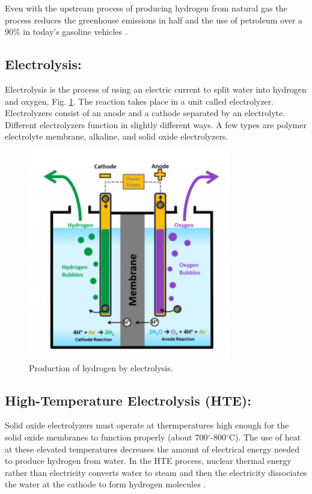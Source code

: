\documentclass{anstrans}
\begin{document}
Even with the upstream process of producing hydrogen from natural gas the process reduces the greenhouse emissions in half and the use of petroleum over a 90\% in today's gasoline vehicles \cite{noauthor_hydrogen_nodate}.

\subsection{Electrolysis:}

Electrolysis is the process of using an electric current to split water into hydrogen and oxygen, Fig. \ref{fig:electro}. The reaction takes place in a unit called electrolyzer. Electrolyzers consist of an anode and a cathode separated by an electrolyte. Different electrolyzers function in slightly different ways. A few types are polymer electrolyte membrane, alkaline, and solid oxide electrolyzers.

\begin{figure}[]
	\centering
	\includegraphics[width=0.55\linewidth]{figures/electrolysis.png}
	\hfill
	\caption{Production of hydrogen by electrolysis.}
	\label{fig:electro}
\end{figure}

\subsection{High-Temperature Electrolysis (HTE):}

Solid oxide electrolyzers must operate at thermperatures high enough for the solid oxide membranes to function properly (about 700$^{\circ}$-800$^{\circ}$C). The use of heat at these elevated temperatures decreases the amount of electrical energy needed to produce hydrogen from water. In the HTE process, nuclear thermal energy rather than electricity converts water to steam and then the electricity dissociates the water at the cathode to form hydrogen molecules \cite{xu_introduction_2017}.
\end{document}
